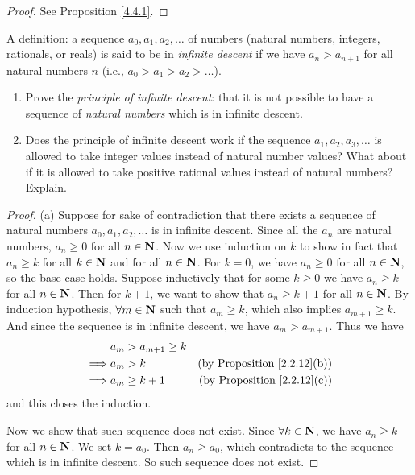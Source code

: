 \begin{proof}
    See Proposition \ref{4.4.1}.
\end{proof}

\begin{exercise}\label{ex 4.4.2}
    A definition: a sequence \(a_0, a_1, a_2, \dots\) of numbers (natural numbers, integers, rationals, or reals) is said to be in \emph{infinite descent} if we have \(a_n > a_{n + 1}\) for all natural numbers \(n\)
    (i.e., \(a_0 > a_1 > a_2 > \dots\)).
    \begin{enumerate}
        \item Prove the \emph{principle of infinite descent}:
              that it is not possible to have a sequence of \emph{natural numbers} which is in infinite descent.
        \item Does the principle of infinite descent work if the sequence \(a_1, a_2, a_3, \dots\) is allowed to take integer values instead of natural number values?
              What about if it is allowed to take positive rational values instead of natural numbers?
              Explain.
    \end{enumerate}
\end{exercise}

\begin{proof}{(a)}
    Suppose for sake of contradiction that there exists a sequence of natural numbers \(a_0, a_1, a_2, \dots\) is in infinite descent.
    Since all the \(a_n\) are natural numbers, \(a_n \geq 0\) for all \(n \in \mathbf{N}\).
    Now we use induction on \(k\) to show in fact that \(a_n \geq k\) for all \(k \in \mathbf{N}\) and for all \(n \in \mathbf{N}\).
    For \(k = 0\), we have \(a_n \geq 0\) for all \(n \in \mathbf{N}\), so the base case holds.
    Suppose inductively that for some \(k \geq 0\) we have \(a_n \geq k\) for all \(n \in \mathbf{N}\).
    Then for \(k + 1\), we want to show that \(a_n \geq k + 1\) for all \(n \in \mathbf{N}\).
    By induction hypothesis, \(\forall m \in \mathbf{N}\) such that \(a_m \geq k\), which also implies \(a_{m + 1} \geq k\).
    And since the sequence is in infinite descent, we have \(a_m > a_{m + 1}\).
    Thus we have
    \begin{align*}
                 & a_m > a_{m + 1} \geq k                                           \\
        \implies & a_m > k                & \text{(by Proposition \ref{2.2.12}(b))} \\
        \implies & a_m \geq k + 1         & \text{(by Proposition \ref{2.2.12}(c))}
    \end{align*}
    and this closes the induction.

    Now we show that such sequence does not exist.
    Since \(\forall k \in \mathbf{N}\), we have \(a_n \geq k\) for all \(n \in \mathbf{N}\).
    We set \(k = a_0\).
    Then \(a_n \geq a_0\), which contradicts to the sequence which is in infinite descent.
    So such sequence does not exist.
\end{proof}

